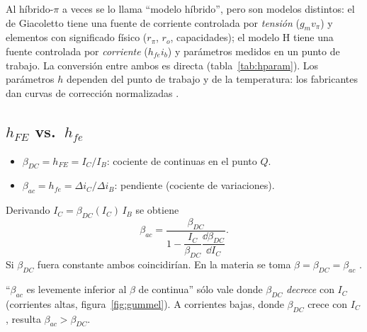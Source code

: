 \begin{ojo}
Al híbrido-$\pi$ a veces se lo llama ``modelo híbrido'', pero son modelos distintos: el de
Giacoletto tiene una fuente de corriente controlada por \emph{tensión} ($g_mv_\pi$) y elementos
con significado físico ($r_\pi$, $r_o$, capacidades); el modelo H tiene una fuente controlada
por \emph{corriente} ($h_{fe}i_b$) y parámetros medidos en un punto de trabajo. La conversión
entre ambos es directa (tabla~\ref{tab:hparam}). Los parámetros $h$ dependen del punto de
trabajo y de la temperatura: los fabricantes dan curvas de corrección normalizadas
.
\end{ojo}

\subsection{\texorpdfstring{$h_{FE}$ vs.\ $h_{fe}$}{hFE vs hfe}}

\begin{itemize}
  \item $\beta_{DC}=h_{FE}=I_C/I_B$: cociente de continuas en el punto $Q$.
  \item $\beta_{ac}=h_{fe}=\Delta i_C/\Delta i_B$: pendiente (cociente de variaciones).
\end{itemize}
Derivando $I_C=\beta_{DC}(I_C)\,I_B$ se obtiene
\[
  \beta_{ac} = \frac{\beta_{DC}}{1-\dfrac{I_C}{\beta_{DC}}\dfrac{\dd\beta_{DC}}{\dd I_C}} .
\]
Si $\beta_{DC}$ fuera constante ambos coincidirían. En la materia se toma
$\beta=\beta_{DC}=\beta_{ac}$ .

\begin{ojo}[\diapo{2.29}]
``$\beta_{ac}$ es levemente inferior al $\beta$ de continua'' sólo vale donde $\beta_{DC}$
\emph{decrece} con $I_C$ (corrientes altas, figura~\ref{fig:gummel}). A corrientes bajas, donde
$\beta_{DC}$ crece con $I_C$, resulta $\beta_{ac}>\beta_{DC}$.
\end{ojo}
